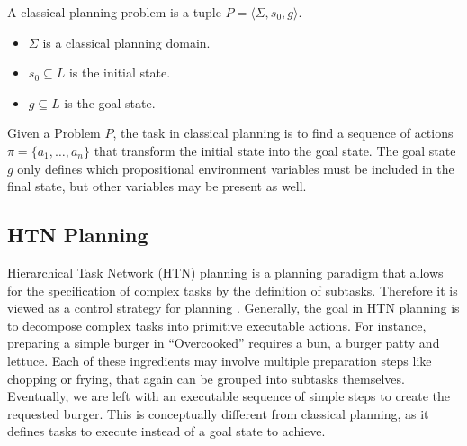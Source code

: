 \begin{definition}
  A classical planning problem is a tuple $P=\langle \Sigma, s_0, g \rangle$.
  \begin{itemize}
    \item $\Sigma$ is a classical planning domain.
    \item $s_0 \subseteq L$ is the initial state.
    \item $g \subseteq L$ is the goal state.
  \end{itemize}
\end{definition}

Given a Problem $P$, the task in classical planning is to find a sequence of actions $\pi = \{a_1,\dots,a_n\}$ that transform the initial state into the goal state.
The goal state $g$ only defines which propositional environment variables must be included in the final state, but other variables may be present as well.

\subsection{HTN Planning}\label{sec:htn-planning}

Hierarchical Task Network (HTN) planning is a planning paradigm that allows for the specification of complex tasks by the definition of subtasks.
Therefore it is viewed as a control strategy for planning \citep[chap.~11]{ghallabAutomatedPlanningTheory2004}.
Generally, the goal in HTN planning is to decompose complex tasks into primitive executable actions.
For instance, preparing a simple burger in ``Overcooked'' requires a bun, a burger patty and lettuce.
Each of these ingredients may involve multiple preparation steps like chopping or frying, that again can be grouped into subtasks themselves.
Eventually, we are left with an executable sequence of simple steps to create the requested burger.
This is conceptually different from classical planning, as it defines tasks to execute instead of a goal state to achieve.




